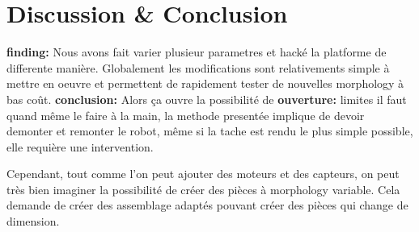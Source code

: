 






\section{Discussion \& Conclusion} %
\textbf{finding:} Nous avons fait varier plusieur parametres et hacké la platforme de differente manière. Globalement les modifications sont relativements simple à mettre en oeuvre et permettent de rapidement tester de nouvelles morphology à bas coût.
\textbf{conclusion:} Alors ça ouvre la possibilité de
\textbf{ouverture:}
limites il faut quand même le faire à la main, la methode presentée implique de devoir demonter et remonter le robot, même si la tache est rendu le plus simple possible, elle requière une intervention.

Cependant, tout comme l'on peut ajouter des moteurs et des capteurs, on peut très bien imaginer la possibilité de créer des pièces à morphology variable. Cela demande de créer des assemblage adaptés pouvant créer des pièces qui change de dimension.

